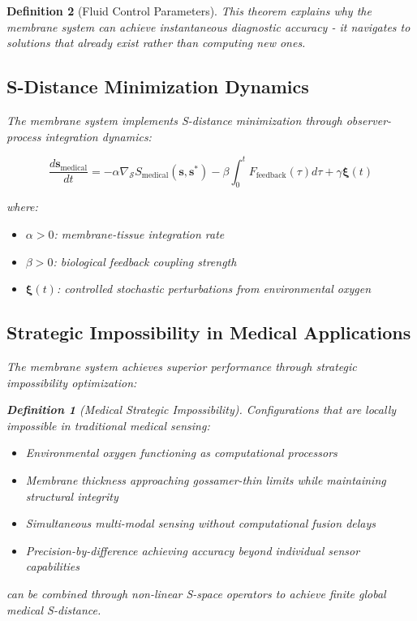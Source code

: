 \documentclass[12pt,a4paper]{article}
\newtheorem{definition}{Definition}
\begin{document}
\begin{definition}[Fluid Control Parameters]
This theorem explains why the membrane system can achieve instantaneous diagnostic accuracy - it navigates to solutions that already exist rather than computing new ones.

\subsection{S-Distance Minimization Dynamics}

The membrane system implements S-distance minimization through observer-process integration dynamics:

\begin{equation}
\frac{d\mathbf{s}_{\text{medical}}}{dt} = -\alpha \nabla_{\mathcal{S}} S_{\text{medical}}(\mathbf{s}, \mathbf{s}^*) - \beta \int_0^t F_{\text{feedback}}(\tau) d\tau + \gamma \mathbf{\xi}(t)
\end{equation}

where:
\begin{itemize}
\item $\alpha > 0$: membrane-tissue integration rate
\item $\beta > 0$: biological feedback coupling strength
\item $\mathbf{\xi}(t)$: controlled stochastic perturbations from environmental oxygen
\end{itemize}

\subsection{Strategic Impossibility in Medical Applications}

The membrane system achieves superior performance through strategic impossibility optimization:

\begin{definition}[Medical Strategic Impossibility]
Configurations that are locally impossible in traditional medical sensing:
\begin{itemize}
\item Environmental oxygen functioning as computational processors
\item Membrane thickness approaching gossamer-thin limits while maintaining structural integrity
\item Simultaneous multi-modal sensing without computational fusion delays
\item Precision-by-difference achieving accuracy beyond individual sensor capabilities
\end{itemize}
can be combined through non-linear S-space operators to achieve finite global medical S-distance.
\end{definition}


\end{definition}
\end{document}
